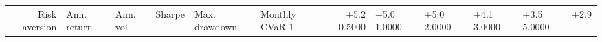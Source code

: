 \begin{tabular}{rllrllrl}
\toprule
Risk aversion & Ann. return & Ann. vol. & Sharpe & Max. drawdown & Monthly CVaR 1%
 & +5.2%
0.5000 & +5.0%
1.0000 & +5.0%
2.0000 & +4.1%
3.0000 & +3.5%
5.0000 & +2.9%
\bottomrule
\end{tabular}
